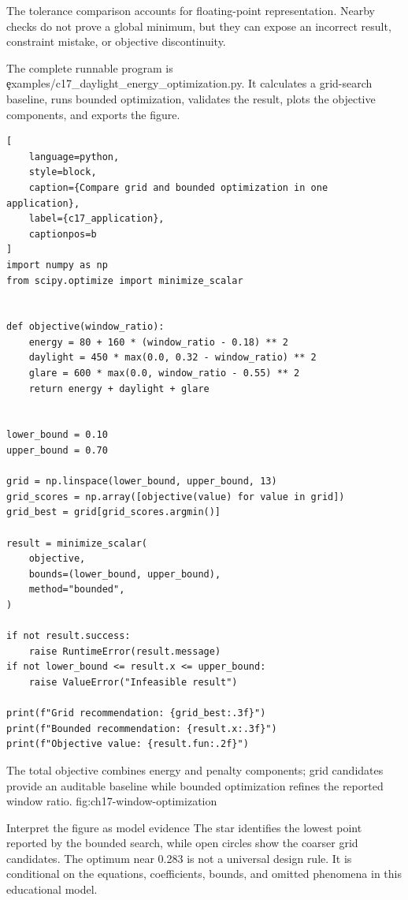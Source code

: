 The tolerance comparison accounts for floating-point representation. Nearby
checks do not prove a global minimum, but they can expose an incorrect result,
constraint mistake, or objective discontinuity.

\label{sec:c17-application}

The complete runnable program is
\c{examples/c17_daylight_energy_optimization.py}. It calculates a grid-search
baseline, runs bounded optimization, validates the result, plots the objective
components, and exports the figure.

\begin{lstlisting}[
    language=python,
    style=block,
    caption={Compare grid and bounded optimization in one application},
    label={c17_application},
    captionpos=b
]
import numpy as np
from scipy.optimize import minimize_scalar


def objective(window_ratio):
    energy = 80 + 160 * (window_ratio - 0.18) ** 2
    daylight = 450 * max(0.0, 0.32 - window_ratio) ** 2
    glare = 600 * max(0.0, window_ratio - 0.55) ** 2
    return energy + daylight + glare


lower_bound = 0.10
upper_bound = 0.70

grid = np.linspace(lower_bound, upper_bound, 13)
grid_scores = np.array([objective(value) for value in grid])
grid_best = grid[grid_scores.argmin()]

result = minimize_scalar(
    objective,
    bounds=(lower_bound, upper_bound),
    method="bounded",
)

if not result.success:
    raise RuntimeError(result.message)
if not lower_bound <= result.x <= upper_bound:
    raise ValueError("Infeasible result")

print(f"Grid recommendation: {grid_best:.3f}")
print(f"Bounded recommendation: {result.x:.3f}")
print(f"Objective value: {result.fun:.2f}")
\end{lstlisting}

{The total objective combines energy and penalty components; grid candidates provide an auditable baseline while bounded optimization refines the reported window ratio.}
{fig:ch17-window-optimization}

\begin{ExplainBox}{Interpret the figure as model evidence}
The star identifies the lowest point reported by the bounded search, while open
circles show the coarser grid candidates. The optimum near 0.283 is not a
universal design rule. It is conditional on the equations, coefficients,
bounds, and omitted phenomena in this educational model.
\end{ExplainBox}

